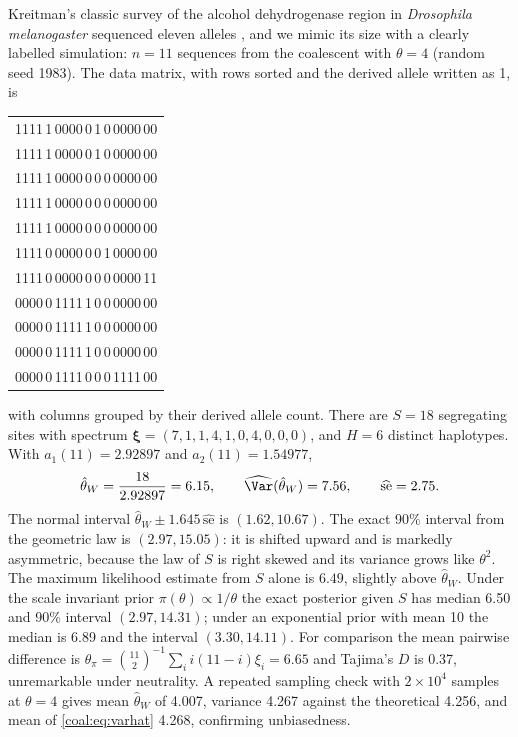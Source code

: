 \begin{example}\label{coal:ex:watterson}
Kreitman's classic survey of the alcohol dehydrogenase region in \emph{Drosophila melanogaster} sequenced eleven alleles \citep{coal:kreitman1983}, and we mimic its size with a clearly labelled simulation: $n=11$ sequences from the coalescent with $\theta=4$ (random seed 1983). The data matrix, with rows sorted and the derived allele written as 1, is
\begin{center}
\small\ttfamily
\begin{tabular}{l}
1111\,1\,0000\,0\,1\,0\,0000\,00\\
1111\,1\,0000\,0\,1\,0\,0000\,00\\
1111\,1\,0000\,0\,0\,0\,0000\,00\\
1111\,1\,0000\,0\,0\,0\,0000\,00\\
1111\,1\,0000\,0\,0\,0\,0000\,00\\
1111\,0\,0000\,0\,0\,1\,0000\,00\\
1111\,0\,0000\,0\,0\,0\,0000\,11\\
0000\,0\,1111\,1\,0\,0\,0000\,00\\
0000\,0\,1111\,1\,0\,0\,0000\,00\\
0000\,0\,1111\,1\,0\,0\,0000\,00\\
0000\,0\,1111\,0\,0\,0\,1111\,00
\end{tabular}
\end{center}
with columns grouped by their derived allele count. There are $S=18$ segregating sites with spectrum $\bm\xi=(7,1,1,4,1,0,4,0,0,0)$, and $H=6$ distinct haplotypes. With $a_1(11)=2.92897$ and $a_2(11)=1.54977$,
\[
\hat\theta_W=\frac{18}{2.92897}=6.15,\qquad \widehat{\Var}(\hat\theta_W)=7.56,\qquad \widehat{\mathrm{se}}=2.75.
\]
The normal interval $\hat\theta_W\pm1.645\,\widehat{\mathrm{se}}$ is $(1.62,10.67)$. The exact 90\% interval from the geometric law is $(2.97,15.05)$: it is shifted upward and is markedly asymmetric, because the law of $S$ is right skewed and its variance grows like $\theta^2$. The maximum likelihood estimate from $S$ alone is $6.49$, slightly above $\hat\theta_W$. Under the scale invariant prior $\pi(\theta)\propto1/\theta$ the exact posterior given $S$ has median 6.50 and 90\% interval $(2.97,14.31)$; under an exponential prior with mean 10 the median is 6.89 and the interval $(3.30,14.11)$. For comparison the mean pairwise difference is $\hat\theta_\pi=\binom{11}{2}^{-1}\sum_ii(11-i)\xi_i=6.65$ and Tajima's $D$ \citep{coal:tajima1989} is 0.37, unremarkable under neutrality. A repeated sampling check with $2\times10^4$ samples at $\theta=4$ gives mean $\hat\theta_W$ of 4.007, variance 4.267 against the theoretical 4.256, and mean of \eqref{coal:eq:varhat} 4.268, confirming unbiasedness.
\end{example}

